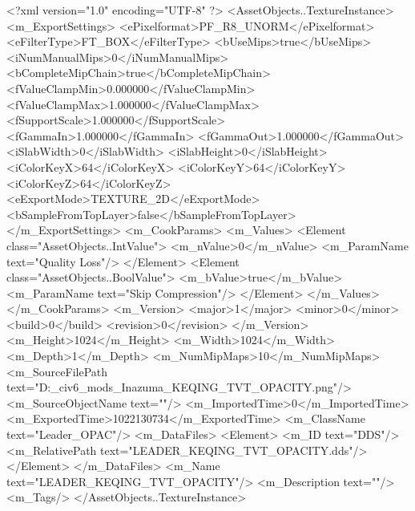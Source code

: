 <?xml version="1.0" encoding="UTF-8" ?>
<AssetObjects..TextureInstance>
	<m_ExportSettings>
		<ePixelformat>PF_R8_UNORM</ePixelformat>
		<eFilterType>FT_BOX</eFilterType>
		<bUseMips>true</bUseMips>
		<iNumManualMips>0</iNumManualMips>
		<bCompleteMipChain>true</bCompleteMipChain>
		<fValueClampMin>0.000000</fValueClampMin>
		<fValueClampMax>1.000000</fValueClampMax>
		<fSupportScale>1.000000</fSupportScale>
		<fGammaIn>1.000000</fGammaIn>
		<fGammaOut>1.000000</fGammaOut>
		<iSlabWidth>0</iSlabWidth>
		<iSlabHeight>0</iSlabHeight>
		<iColorKeyX>64</iColorKeyX>
		<iColorKeyY>64</iColorKeyY>
		<iColorKeyZ>64</iColorKeyZ>
		<eExportMode>TEXTURE_2D</eExportMode>
		<bSampleFromTopLayer>false</bSampleFromTopLayer>
	</m_ExportSettings>
	<m_CookParams>
		<m_Values>
			<Element class="AssetObjects..IntValue">
				<m_nValue>0</m_nValue>
				<m_ParamName text="Quality Loss"/>
			</Element>
			<Element class="AssetObjects..BoolValue">
				<m_bValue>true</m_bValue>
				<m_ParamName text="Skip Compression"/>
			</Element>
		</m_Values>
	</m_CookParams>
	<m_Version>
		<major>1</major>
		<minor>0</minor>
		<build>0</build>
		<revision>0</revision>
	</m_Version>
	<m_Height>1024</m_Height>
	<m_Width>1024</m_Width>
	<m_Depth>1</m_Depth>
	<m_NumMipMaps>10</m_NumMipMaps>
	<m_SourceFilePath text="D:\Documents\GitHub\Uzuki_civ6_mods\Liyue_Inazuma\LEADER_KEQING_TVT_OPACITY.png"/>
	<m_SourceObjectName text=""/>
	<m_ImportedTime>0</m_ImportedTime>
	<m_ExportedTime>1022130734</m_ExportedTime>
	<m_ClassName text="Leader_OPAC"/>
	<m_DataFiles>
		<Element>
			<m_ID text="DDS"/>
			<m_RelativePath text="LEADER_KEQING_TVT_OPACITY.dds"/>
		</Element>
	</m_DataFiles>
	<m_Name text="LEADER_KEQING_TVT_OPACITY"/>
	<m_Description text=""/>
	<m_Tags/>
</AssetObjects..TextureInstance>

